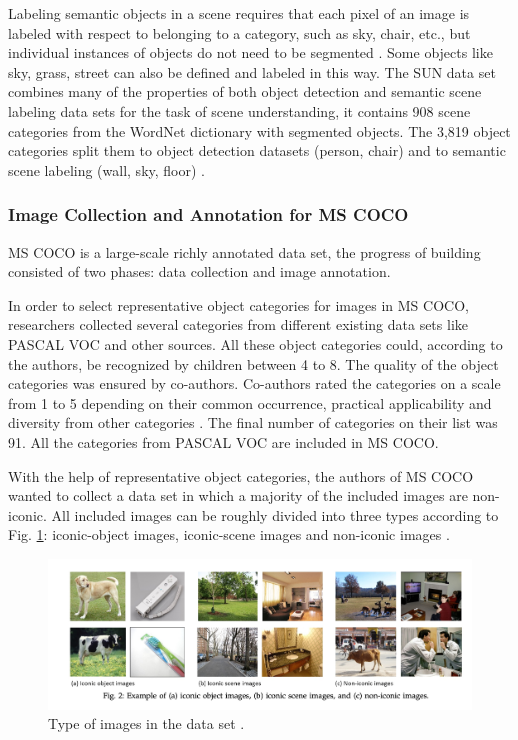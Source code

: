 \documentclass[
]{krantz}
\begin{document}
Labeling semantic objects in a scene requires that each pixel of an image is labeled with respect to belonging to a category, such as sky, chair, etc., but individual instances of objects do not need to be segmented \citep{mccoco}. Some objects like sky, grass, street can also be defined and labeled in this way.
The SUN data set \citep{sun} combines many of the properties of both object detection and semantic scene labeling data sets for the task of scene understanding, it contains 908 scene categories from the WordNet dictionary \citep{WordNet} with segmented objects.
The 3,819 object categories split them to object detection datasets (person, chair) and to semantic scene labeling (wall, sky, floor) \citep{mccoco}.

\hypertarget{image-collection-and-annotation-for-ms-coco}{%
\subsubsection{Image Collection and Annotation for MS COCO}\label{image-collection-and-annotation-for-ms-coco}}

MS COCO is a large-scale richly annotated data set, the progress of building consisted of two phases: data collection and image annotation.

In order to select representative object categories for images in MS COCO, researchers collected several categories from different existing data sets like PASCAL VOC \citep{pascalvoc} and other sources. All these object categories could, according to the authors, be recognized by children between 4 to 8. The quality of the object categories was ensured by co-authors. Co-authors rated the categories on a scale from 1 to 5 depending on their common occurrence, practical applicability and diversity from other categories \citep{mccoco}. The final number of categories on their list was 91. All the categories from PASCAL VOC are included in MS COCO.

With the help of representative object categories, the authors of MS COCO wanted to collect a data set in which a majority of the included images are non-iconic. All included images can be roughly divided into three types according to Fig. \ref{fig:imagetype}: iconic-object images, iconic-scene images and non-iconic images \citep{mccoco}.

\begin{figure}

{\centering \includegraphics[width=1\linewidth]{figures/02-01/2.1 imagetype} 

}

\caption{Type of images in the data set \citep{mccoco}.}\label{fig:imagetype}
\end{figure}
\end{document}
